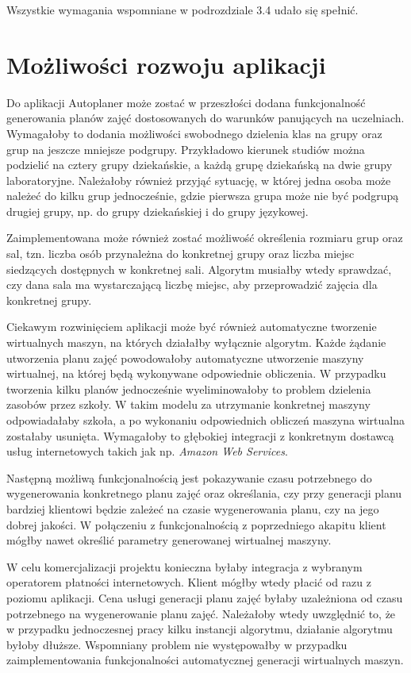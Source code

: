 Wszystkie wymagania wspomniane w podrozdziale 3.4 udało się spełnić.

\section{Możliwości rozwoju aplikacji}

Do aplikacji Autoplaner może zostać w przeszłości dodana funkcjonalność generowania planów zajęć dostosowanych do warunków panujących na uczelniach. Wymagałoby to dodania możliwości swobodnego dzielenia klas na grupy oraz grup na jeszcze mniejsze podgrupy. Przykładowo kierunek studiów można podzielić na cztery grupy dziekańskie, a każdą grupę dziekańską na dwie grupy laboratoryjne. Należałoby również przyjąć sytuację, w której jedna osoba może należeć do kilku grup jednocześnie, gdzie pierwsza grupa może nie być podgrupą drugiej grupy, np. do grupy dziekańskiej i do grupy językowej.

Zaimplementowana może również zostać możliwość określenia rozmiaru grup oraz sal, tzn. liczba osób przynależna do konkretnej grupy oraz liczba miejsc siedzących dostępnych w konkretnej sali. Algorytm musiałby wtedy sprawdzać, czy dana sala ma wystarczającą liczbę miejsc, aby przeprowadzić zajęcia dla konkretnej grupy.

Ciekawym rozwinięciem aplikacji może być również automatyczne tworzenie wirtualnych maszyn, na których działałby wyłącznie algorytm. Każde żądanie utworzenia planu zajęć powodowałoby automatyczne utworzenie maszyny wirtualnej, na której będą wykonywane odpowiednie obliczenia. W przypadku tworzenia kilku planów jednocześnie wyeliminowałoby to problem dzielenia zasobów przez szkoły. W takim modelu za utrzymanie konkretnej maszyny odpowiadałaby szkoła, a po wykonaniu odpowiednich obliczeń maszyna wirtualna zostałaby usunięta. Wymagałoby to głębokiej integracji z konkretnym dostawcą usług internetowych takich jak np. \textit{Amazon Web Services}.

Następną możliwą funkcjonalnością jest pokazywanie czasu potrzebnego do wygenerowania konkretnego planu zajęć oraz określania, czy przy generacji planu bardziej klientowi będzie zależeć na czasie wygenerowania planu, czy na jego dobrej jakości. W połączeniu z funkcjonalnością z poprzedniego akapitu klient mógłby nawet określić parametry generowanej wirtualnej maszyny.

W celu komercjalizacji projektu konieczna byłaby integracja z wybranym operatorem płatności internetowych. Klient mógłby wtedy płacić od razu z poziomu aplikacji. Cena usługi generacji planu zajęć byłaby uzależniona od czasu potrzebnego na wygenerowanie planu zajęć. Należałoby wtedy uwzględnić to, że w przypadku jednoczesnej pracy kilku instancji algorytmu, działanie algorytmu byłoby dłuższe. Wspomniany problem nie występowałby w przypadku zaimplementowania funkcjonalności automatycznej generacji wirtualnych maszyn.